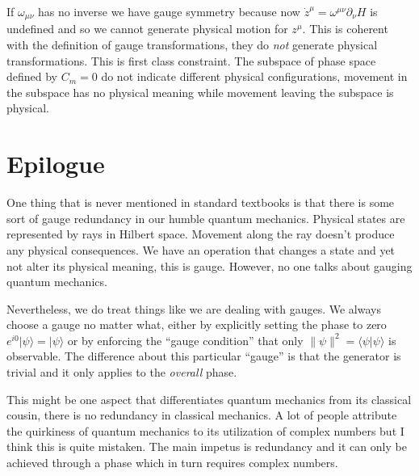 \documentclass[aps,preprint,preprintnumbers,nofootinbib,showpacs,prd]{revtex4-1}
\begin{document}
If $\omega_{\mu\nu}$ has no inverse we have gauge symmetry because now $\dot z^\mu = \omega^{\mu\nu} \partial_\nu H$ is undefined and so we cannot generate physical motion for $z^\mu$. This is coherent with the definition of gauge transformations, they do {\it not} generate physical transformations. This is first class constraint. The subspace of phase space defined by $C_m = 0$ do not indicate different physical configurations, movement in the subspace has no physical meaning while movement leaving the subspace is physical. 



\section{Epilogue}

One thing that is never mentioned in standard textbooks is that there is some sort of gauge redundancy in our humble quantum mechanics. Physical states are represented by rays in Hilbert space. Movement along the ray doesn't produce any physical consequences. We have an operation that changes a state and yet not alter its physical meaning, this is gauge. However, no one talks about gauging quantum mechanics.

Nevertheless, we do treat things like we are dealing with gauges. We always choose a gauge no matter what, either by explicitly setting the phase to zero $e^{i0} | \psi \rangle = | \psi \rangle$ or by enforcing the ``gauge condition'' that only $\lVert \psi \rVert^2 = \langle \psi | \psi \rangle$ is observable. The difference about this particular ``gauge'' is that the generator is trivial and it only applies to the {\it overall} phase.

This might be one aspect that differentiates quantum mechanics from its classical cousin, there is no redundancy in classical mechanics. A lot of people attribute the quirkiness of quantum mechanics to its utilization of complex numbers but I think this is quite mistaken. The main impetus is redundancy and it can only be achieved through a phase which in turn requires complex numbers.
\end{document}
